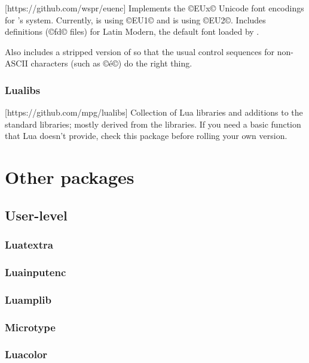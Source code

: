 \documentclass{lltxdoc}
\begin{document}
\medskip
{}[https://github.com/wspr/euenc]
Implements the ©EUx© Unicode font encodings for \latex's  system.
Currently, \xelatex is using ©EU1© and \luatex is using ©EU2©. Includes
definitions (©fd© files) for Latin Modern, the default font loaded by
.

Also includes a stripped version of  so that the usual control
sequences for non-ASCII characters (such as ©\'e©) do the right thing.

\subsubsection{Lualibs}

[https://github.com/mpg/lualibs]
Collection of Lua libraries and additions to the standard libraries; mostly
derived from the \context libraries. If you need a basic function that Lua
doesn't provide, check this package before rolling your own version.

\section{Other packages}

\subsection{User-level}

\subsubsection{Luatextra}

\subsubsection{Luainputenc}

\subsubsection{Luamplib}

\subsubsection{Microtype}

\subsubsection{Luacolor}
\end{document}
